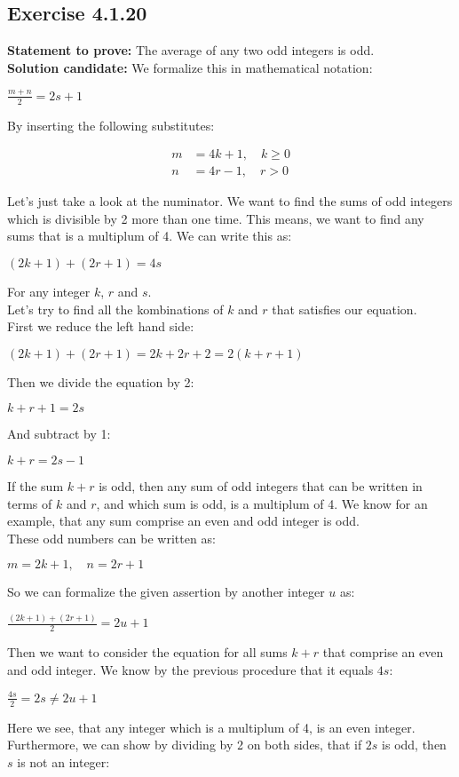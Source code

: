 \documentclass{report}
\newcommand{\cent}[1]{\begin{center}#1\end{center}}
\newcommand{\mAlign}[1]{\begin{align*}#1\end{align*}}
\newcommand{\Prove}{\textbf{Statement to prove: }}
\newcommand{\Solution}{\textbf{Solution candidate: }}
\newcommand{\Exercise}[1]{\subsection{Exercise #1}}
\begin{document}
	\Exercise{4.1.20}
	\Prove
	The average of any two odd integers is odd.\\
	
	\Solution
	We formalize this in mathematical notation:
	
	\cent{$\frac{m +n }{2} = 2s + 1$}
	
	By inserting the following substitutes:
	
	\mAlign{m &= 4k + 1, \quad  k \geq 0\\
				  n &= 4r -1, \quad r > 0}
	
	Let's just take a look at the numinator. We want to find the sums of odd integers which is divisible by 2 more than one time. This means, we want to find any sums that is a multiplum of 4. We can write this as:
	
	\cent{$(2k+1)+(2r+1)=4s$}
	
	For any integer $k$, $r$ and $s$.\\
	
	Let's try to find all the kombinations of $k$ and $r$ that satisfies our equation.\\
	
	First we reduce the left hand side:
	
	\cent{$(2k+1)+ (2r+1) = 2k + 2r + 2 = 2(k+r + 1 )$}
	
	Then we divide the equation by 2:
	
	\cent{$k+r+1=2s$}
	
	And subtract by 1:
	
	\cent{$k+r=2s-1$}
	
	If the sum $k+r$ is odd, then any sum of odd integers that can be written in terms of $k$ and $r$, and which sum is odd, is a multiplum of 4. We know for an example, that any sum comprise an even and odd integer is odd.\\
	
	These odd numbers can be written as:
		
	\cent{$m = 2k+1, \quad n = 2r+1 $}
	
	So we can formalize the given assertion by another integer $u$ as:
	
	\cent{$\frac{(2k+1) + (2r+1)}{2} = 2u +1$}
	
	Then we want to consider the equation for all sums $k+r$ that comprise an even and odd integer. We know by the previous procedure that it equals $4s$:
	
	\cent{$\frac{4s}{2} = 2s \neq 2u +1$}
	
	Here we see, that any integer which is a multiplum of 4, is an even integer. Furthermore, we can show by dividing by 2 on both sides, that if $2s$ is odd, then $s$ is not an integer:
	
\end{document}
